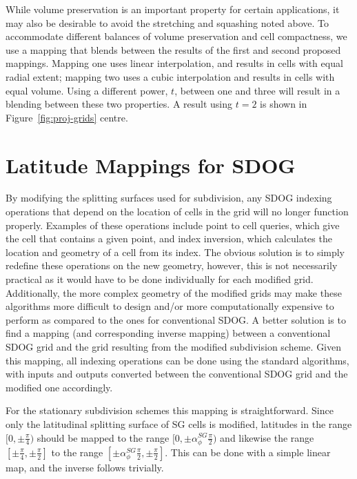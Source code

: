 While volume preservation is an important property for certain applications, it may also be desirable to avoid the stretching and squashing noted above.
To accommodate different balances of volume preservation and cell compactness, we use a mapping that blends between the results of the first and second proposed mappings.
Mapping one uses linear interpolation, and results in cells with equal radial extent; mapping two uses a cubic interpolation and results in cells with equal volume.
Using a different power, $t$, between one and three will result in a blending between these two properties.
A result using $t=2$ is shown in Figure~\ref{fig:proj-grids} centre.


\section{Latitude Mappings for SDOG}

By modifying the splitting surfaces used for subdivision, any SDOG indexing operations that depend on the location of cells in the grid will no longer function properly.
Examples of these operations include point to cell queries, which give the cell that contains a given point, and index inversion, which calculates the location and geometry of a cell from its index.
The obvious solution is to simply redefine these operations on the new geometry, however, this is not necessarily practical as it would have to be done individually for each modified grid.
Additionally, the more complex geometry of the modified grids may make these algorithms more difficult to design and/or more computationally expensive to perform as compared to the ones for conventional SDOG.
A better solution is to find a mapping (and corresponding inverse mapping) between a conventional SDOG grid and the grid resulting from the modified subdivision scheme.
Given this mapping, all indexing operations can be done using the standard algorithms, with inputs and outputs converted between the conventional SDOG grid and the modified one accordingly.


For the stationary subdivision schemes this mapping is straightforward.
Since only the latitudinal splitting surface of SG cells is modified, latitudes in the range $[0, \pm\frac{\pi}{4})$ should be mapped to the range $[0, \pm\alpha_{\phi}^{SG} \frac{\pi}{2})$ and likewise the range $[\pm\frac{\pi}{4}, \pm\frac{\pi}{2}]$ to the range $[\pm\alpha_{\phi}^{SG} \frac{\pi}{2}, \pm\frac{\pi}{2}]$.
This can be done with a simple linear map, and the inverse follows trivially.


